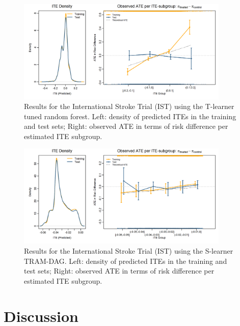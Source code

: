 \begin{figure}[htbp]
\centering
\includegraphics[width=0.9\textwidth]{img/results_IST/IST_tuned_rf_tlearner_density_ITE_ATE.png}
\caption{Results for the International Stroke Trial (IST) using the T-learner tuned random forest. Left: density of predicted ITEs in the training and test sets; Right: observed ATE in terms of risk difference per estimated ITE subgroup.}
\label{fig:IST_density_ITE_ATE_tuned_rf}
\end{figure}


\begin{figure}[htbp]
\centering
\includegraphics[width=0.9\textwidth]{img/results_IST/IST_TRAM_DAG_slearner_density_ITE_ATE.png}
\caption{Results for the International Stroke Trial (IST) using the S-learner TRAM-DAG. Left: density of predicted ITEs in the training and test sets; Right: observed ATE in terms of risk difference per estimated ITE subgroup.}
\label{fig:IST_density_ITE_ATE_TRAM_DAG}
\end{figure}




\FloatBarrier

\section{Discussion}

